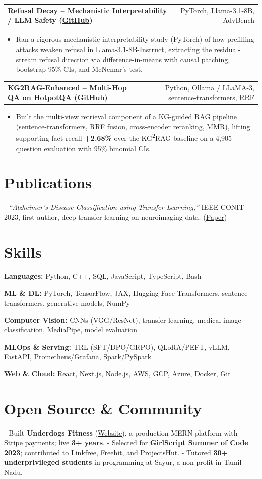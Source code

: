 \documentclass[letterpaper,11pt]{article}
\makeatletter
\newcommand{\projItem}[2]{%
  \vspace{2pt}
  \begin{tabular*}{\textwidth}{@{}l@{\extracolsep{\fill}}r@{}}
    \textbf{#1} & #2 \\
  \end{tabular*}\par\vspace{-3pt}
}
\newcommand{\skillLine}[2]{\textbf{#1:} #2\par\vspace{1.5pt}}
\newcommand{\inlineBlock}[1]{{\setlength{\leftskip}{0.18in}\small #1\par}}
\makeatother
\begin{document}
\projItem{Refusal Decay -- Mechanistic Interpretability / LLM Safety {\normalfont\small(\href{https://github.com/Deva-1903/refusal-decay}{GitHub})}}{PyTorch, Llama-3.1-8B, AdvBench}
\begin{itemize}
  \item Ran a rigorous mechanistic-interpretability study (PyTorch) of how prefilling attacks weaken refusal in Llama-3.1-8B-Instruct, extracting the residual-stream refusal direction via difference-in-means with causal patching, bootstrap 95\% CIs, and McNemar's test.
\end{itemize}

\projItem{KG2RAG-Enhanced -- Multi-Hop QA on HotpotQA {\normalfont\small(\href{https://github.com/Deva-1903/KG2RAG-685-NLP}{GitHub})}}{Python, Ollama / LLaMA-3, sentence-transformers, RRF}
\begin{itemize}
  \item Built the multi-view retrieval component of a KG-guided RAG pipeline (sentence-transformers, RRF fusion, cross-encoder reranking, MMR), lifting supporting-fact recall \textbf{+2.68\%} over the KG\textsuperscript{2}RAG baseline on a 4{,}905-question evaluation with 95\% binomial CIs.
\end{itemize}

\section{Publications}
\vspace{2pt}
\inlineBlock{- \textit{``Alzheimer's Disease Classification using Transfer Learning,''} IEEE CONIT 2023, first author, deep transfer learning on neuroimaging data. {\normalfont\small(\href{https://ieeexplore.ieee.org/document/10205760}{Paper})}}

\section{Skills}
\skillLine{Languages}{Python, C++, SQL, JavaScript, TypeScript, Bash}
\skillLine{ML \& DL}{PyTorch, TensorFlow, JAX, Hugging Face Transformers, sentence-transformers, generative models, NumPy}
\skillLine{Computer Vision}{CNNs (VGG/ResNet), transfer learning, medical image classification, MediaPipe, model evaluation}
\skillLine{MLOps \& Serving}{TRL (SFT/DPO/GRPO), QLoRA/PEFT, vLLM, FastAPI, Prometheus/Grafana, Spark/PySpark}
\skillLine{Web \& Cloud}{React, Next.js, Node.js, AWS, GCP, Azure, Docker, Git}

\section{Open Source \& Community}
\inlineBlock{- Built \textbf{Underdogs Fitness} (\href{https://www.underdogsfitness.in/}{Website}), a production MERN platform with Stripe payments; live \textbf{3+ years}. - Selected for \textbf{GirlScript Summer of Code 2023}; contributed to Linkfree, Freehit, and ProjectsHut. - Tutored \textbf{30+ underprivileged students} in programming at Sayur, a non-profit in Tamil Nadu.}
\end{document}
